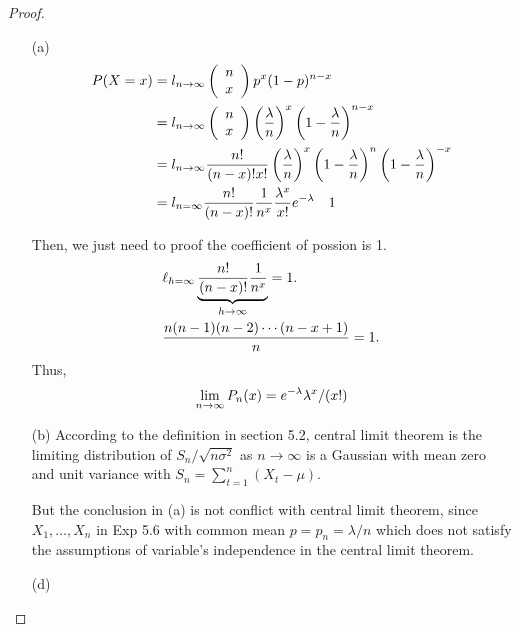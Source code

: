 \begin{proof}
	
\begin{enumerate}
	\item[(a)] 
		\begin{equation}
		\begin{aligned}
		\notag
		P(X=x) &=l_{n \rightarrow \infty}\left(\begin{array}{l}
		n \\
		x
		\end{array}\right) p^{x}(1-p)^{n-x}  \\
		&=l_{n \rightarrow \infty}\left(\begin{array}{l}
		n \\
		x
		\end{array}\right)\left(\frac{\lambda}{n}\right)^{x}\left(1-\frac{\lambda}{n}\right)^{n-x}  \\
		&=l_{n \rightarrow \infty} \frac{n !}{(n-x) ! x !}\left(\frac{\lambda}{n}\right)^{x}\left(1-\frac{\lambda}{n}\right)^{n}\left(1-\frac{\lambda}{n}\right)^{-x} \\
		&=l_{n=\infty} \frac{n !}{(n-x) !} \frac{1}{n^{x}} \frac{\lambda^{x}}{x !} e^{-\lambda} \quad 1
		\end{aligned}
		\end{equation}
		
		Then, we just need to proof the coefficient of possion is 1.
		\begin{equation}
		\begin{aligned}
		\notag
		&\ell_{h=\infty} \underbrace{\frac{n !}{(n-x) !} \frac{1}{n^{x}}}_{h \rightarrow \infty}=1 . \\
		&\frac{n(n-1)(n-2) \cdots(n-x+1)}{n}=1 .
		\end{aligned}
		\end{equation}
		Thus, 
		\begin{equation} 
		\notag
		\lim _{n \rightarrow \infty} P_{n}(x)=e^{-\lambda} \lambda^{x} /(x !)
		\end{equation}
	\item [(b)]
		According to the definition in section 5.2, central limit theorem is the limiting distribution of $S_{n} / \sqrt{n \sigma^{2}}$ as $n \rightarrow \infty$ is a Gaussian with mean zero and unit variance with $S_{n}=\sum_{t=1}^{n}\left(X_{t}-\mu \right)$. 
		
		But  the conclusion in (a) is not conflict with central limit theorem, since $X_1, \ldots, X_n$ in Exp 5.6 with common mean $p=p_{n}=\lambda / n$ which does not satisfy the assumptions of variable's independence in the central limit theorem.
	\item [(d)]


\end{enumerate}
\end{proof}
